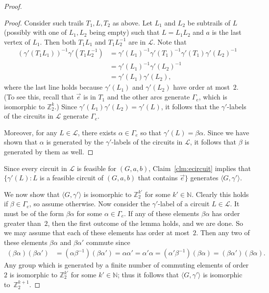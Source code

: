 \documentclass[10pt,a4paper]{amsart}
\begin{document}
\begin{proof}
\begin{proof}
        Consider such trails $T_1, L, T_2$ as above. Let $L_1$ and $L_2$ be subtrails of $L$ (possibly with one of $L_1, L_2$ being empty) such that $L=L_1 L_2$ and $a$ is the last vertex of $L_1$. Then both $T_1 L_1$ and $T_1 L_2^{-1}$ are in $\mathcal{L}$. Note that \begin{align*}
        (\gamma'(T_1 L_1))^{-1}\gamma'(T_1 L_2^{-1})&=\gamma'(L_1)^{-1}\gamma'(T_1)^{-1}\gamma'(T_1)\gamma'(L_2)^{-1}\\&=\gamma'(L_1)^{-1}\gamma'(L_2)^{-1}\\&=\gamma'(L_1)\gamma'(L_2),
        \end{align*}where the last line holds because $\gamma'(L_1)$ and $\gamma'(L_2)$ have order at most~$2$. (To see this, recall that $\vec{e}$ is in $T_1$ and the other arcs generate $\Gamma_e$, which is isomorphic to $\mathbb{Z}_2^k$.) Since $\gamma'(L_1)\gamma'(L_2)= \gamma'(L)$, it follows that the $\gamma'$-labels of the circuits in $\mathcal{L}$ generate $\Gamma_e$.
    
        Moreover, for any $L \in \mathcal{L}$, there exists $\alpha \in \Gamma_e$ so that $\gamma'(L)=\beta\alpha$. Since we have shown that $\alpha$ is generated by the $\gamma'$-labels of the circuits in $\mathcal{L}$, it follows that $\beta$ is generated by them as well.
    \end{proof}

    Since every circuit in $\mathcal{L}$ is feasible for $(G, a, b)$, Claim~\ref{clm:ecircuit} implies that $\{\gamma'(L): L$ is a feasible circuit of $(G, a, b)$ that contains $\vec{e}\}$ generates $\langle G, \gamma'\rangle$.

    We now show that $\langle G, \gamma'\rangle$ is isomorphic to $\mathbb{Z}_2^{k'}$ for some $k' \in \mathbb{N}$. Clearly this holds if $\beta \in \Gamma_e$, so assume otherwise. Now consider the $\gamma'$-label of a circuit $L \in \mathcal{L}$. It must be of the form $\beta\alpha$ for some $\alpha \in \Gamma_e$. If any of these elements $\beta\alpha$ has order greater than~$2$, then the first outcome of the lemma holds, and we are done. So we may assume that each of these elements has order at most~$2$. Then any two of these elements $\beta\alpha$ and $\beta\alpha'$ commute since
        \begin{align*}
        (\beta\alpha)(\beta\alpha') &= (\alpha\beta^{-1})(\beta\alpha')
        = \alpha\alpha'
        =\alpha'\alpha
        = (\alpha'\beta^{-1})(\beta\alpha)
        = (\beta\alpha')(\beta\alpha).
        \end{align*}
    Any group which is generated by a finite number of commuting elements of order $2$ is isomorphic to $\mathbb{Z}_2^{k'}$ for some $k' \in \mathbb{N}$; thus it follows that $\langle G, \gamma'\rangle$ is isomorphic to~$\mathbb{Z}_2^{k+1}$.


\end{proof}
\end{document}
